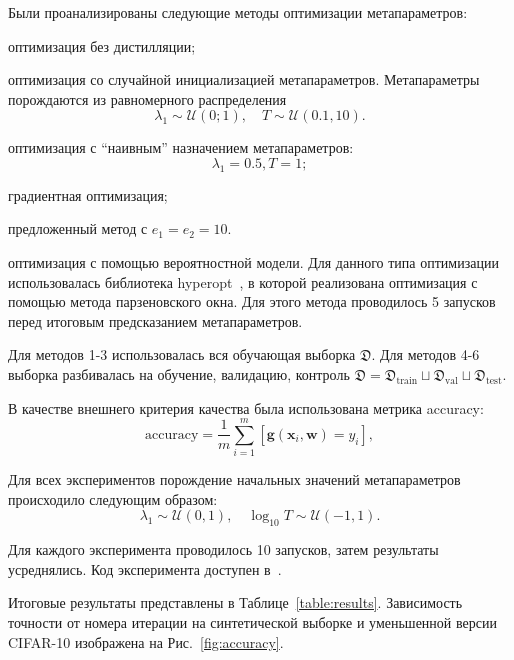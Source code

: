 \documentclass[12pt]{a&t}
\begin{document}
Были проанализированы следующие методы оптимизации метапараметров:
\begin{enumlist}
    \item оптимизация без дистилляции;
    \item оптимизация со случайной инициализацией метапараметров. Метапараметры порождаются из равномерного распределения $$\lambda_1 \sim \mathcal{U}(0;1), \quad T \sim \mathcal{U}(0.1, 10).$$
    \item оптимизация с ``наивным'' назначением метапараметров:  $$\lambda_1 = 0.5, T = 1;$$
    \item градиентная оптимизация;
    \item предложенный метод с $e_1=e_2=10.$
    \item оптимизация с помощью вероятностной модели. Для данного типа оптимизации использовалась библиотека hyperopt~\cite{bergstra2013making}, в которой реализована оптимизация с помощью метода парзеновского окна. Для этого метода проводилось 5 запусков перед итоговым предсказанием метапараметров.
\end{enumlist}

Для методов 1-3 использовалась вся обучающая выборка $\mathfrak{D}$. Для методов 4-6 выборка разбивалась на обучение, валидацию, контроль $\mathfrak{D} = \mathfrak{D}_\text{train} \sqcup \mathfrak{D}_\text{val} \sqcup \mathfrak{D}_\text{test}.$

В качестве внешнего критерия качества была использована метрика accuracy:
$$
    \text{accuracy} = \frac{1}{m}\sum\limits_{i=1}^m [\mathbf{g}(\mathbf{x}_i, \mathbf{w}) = y_i],
$$

Для всех экспериментов порождение начальных значений метапараметров происходило следующим образом: 
$$\lambda_1 \sim \mathcal{U}(0,1),\quad \log_{10} T \sim \mathcal{U}(-1, 1).$$ 

Для каждого эксперимента проводилось 10 запусков, затем результаты усреднялись. Код эксперимента доступен в~\cite{source_code}.

Итоговые результаты представлены в Таблице~\ref{table:results}. Зависимость точности от номера итерации на синтетической выборке и уменьшенной версии CIFAR-10 изображена на Рис.~\ref{fig:accuracy}.
\end{document}

